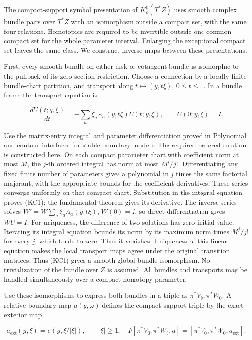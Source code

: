 \documentclass[
  11pt,
]{article}
\begin{document}
The compact-support symbol presentation of \(K_c^0(T^*Z)\) uses smooth
complex bundle pairs over \(T^*Z\) with an isomorphism outside a compact
set, with the same four relations. Homotopies are required to be
invertible outside one common compact set for the whole parameter
interval. Enlarging the exceptional compact set leaves the same class.
We construct inverse maps between these presentations.

First, every smooth bundle on either disk or cotangent bundle is
isomorphic to the pullback of its zero-section restriction. Choose a
connection by a locally finite bundle-chart partition, and transport
along \(t\mapsto (y,t\xi)\), \(0\leq t\leq1\). In a bundle frame the
transport equation is

\[
 \frac{dU(t;y,\xi)}{dt}
    =-\sum_a\xi_a A_a(y,t\xi)U(t;y,\xi),\qquad U(0;y,\xi)=I.
 \tag{KC1}
\]

Use the matrix-entry integral and parameter differentiation proved in
\href{stable-prerequisite-bridges.pdf}{Polynomial and contour interfaces
for stable boundary models}. The required ordered solution is
constructed here. On each compact parameter chart with coefficient norm
at most \(M\), the \(j\)-th ordered integral has norm at most
\(M^j/j!\). Differentiating any fixed finite number of parameters gives
a polynomial in \(j\) times the same factorial majorant, with the
appropriate bounds for the coefficient derivatives. These series
converge uniformly on that compact chart. Substitution in the integral
equation proves (KC1); the fundamental theorem gives its derivative. The
inverse series solves \(W'=W\sum_a\xi_a A_a(y,t\xi)\), \(W(0)=I\), so
direct differentiation gives \(WU=I\). For uniqueness, the difference of
two solutions has zero initial value. Iterating its integral equation
bounds its norm by its maximum norm times \(M^j/j!\) for every \(j\),
which tends to zero. Thus it vanishes. Uniqueness of this linear
equation makes the local transport maps agree under the original
transition matrices. Thus (KC1) gives a smooth global bundle
isomorphism. No trivialization of the bundle over \(Z\) is assumed. All
bundles and transports may be handled simultaneously over a compact
homotopy parameter.

Use these isomorphisms to express both bundles in a triple as
\(\pi^*V_0,\pi^*W_0\). A relative boundary map \(a(y,\omega)\) defines
the compact-support triple by the exact exterior map

\[
 a_{\mathrm{ext}}(y,\xi)=a(y,\xi/|\xi|),\qquad |\xi|\geq1,
 \quad
 F[\pi^*V_0,\pi^*W_0,a]
       =[\pi^*V_0,\pi^*W_0,a_{\mathrm{ext}}].
 \tag{KC2}
\]
\end{document}
